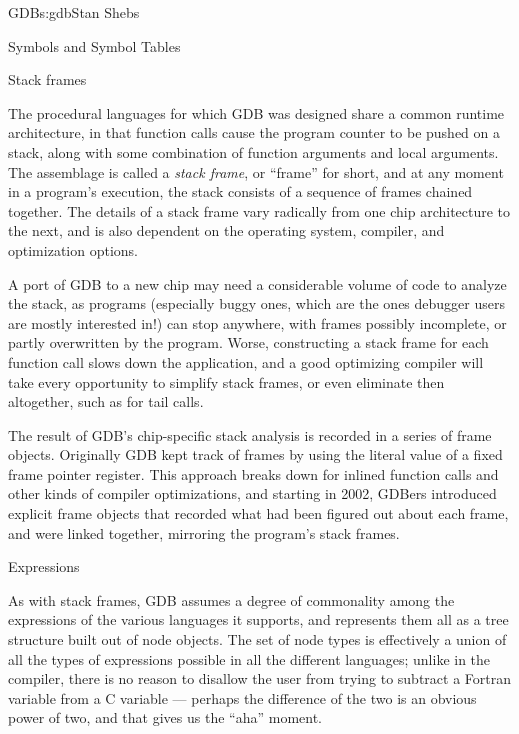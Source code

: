 \begin{aosachapter}{GDB}{s:gdb}{Stan Shebs}
\begin{aosasect2}{Symbols and Symbol Tables}
\end{aosasect2}

\begin{aosasect2}{Stack frames}

The procedural languages for which GDB was designed share a common
runtime architecture, in that function calls cause the program counter
to be pushed on a stack, along with some combination of function
arguments and local arguments.  The assemblage is called a {\em stack
  frame}, or ``frame'' for short, and at any moment in a program's
execution, the stack consists of a sequence of frames chained
together.  The details of a stack frame vary radically from one chip
architecture to the next, and is also dependent on the operating
system, compiler, and optimization options.

A port of GDB to a new chip may need a considerable volume of code to
analyze the stack, as programs (especially buggy ones, which are the
ones debugger users are mostly interested in!) can stop anywhere, with
frames possibly incomplete, or partly overwritten by the program.
Worse, constructing a stack frame for each function call slows down the
application, and a good optimizing compiler will take every
opportunity to simplify stack frames, or even eliminate then
altogether, such as for tail calls.

The result of GDB's chip-specific stack analysis is recorded in a
series of frame objects.  Originally GDB kept track of frames by using
the literal value of a fixed frame pointer register.  This approach
breaks down for inlined function calls and other kinds of compiler
optimizations, and starting in 2002, GDBers introduced explicit frame
objects that recorded what had been figured out about each frame, and
were linked together, mirroring the program's stack frames.

\end{aosasect2}

\begin{aosasect2}{Expressions}

As with stack frames, GDB assumes a degree of commonality among the
expressions of the various languages it supports, and represents them
all as a tree structure built out of node objects.  The set of node
types is effectively a union of all the types of expressions possible
in all the different languages; unlike in the compiler, there is no
reason to disallow the user from trying to subtract a Fortran variable
from a C variable --- perhaps the difference of the two is an obvious
power of two, and that gives us the ``aha'' moment.


\end{aosasect2}
\end{aosachapter}
